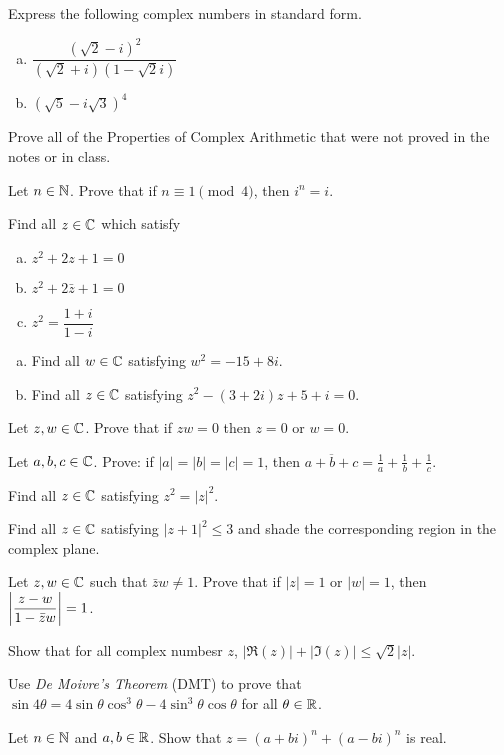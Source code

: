 
\question Express the following complex numbers in standard form.
\begin{enumerate}[(a)]
  \item $\dfrac{(\sqrt2-i)^2}{(\sqrt2+i)(1-\sqrt2i)}$
  \item $(\sqrt5-i\sqrt3)^4$
\end{enumerate}

\question Prove all of the Properties of Complex Arithmetic that were not proved in the notes or in class.

\question Let $n \in \mathbb{N}$. Prove that if $n \equiv 1 \pmod 4$, then $i^n = i$.

\question Find all $z \in \mathbb{C}$ which satisfy
\begin{enumerate}[(a)]
  \item $z^2+2z+1=0$
  \item $z^2+2\bar{z}+1=0$
  \item $z^2 = \dfrac{1+i}{1-i}$
\end{enumerate}

\question \begin{enumerate}[(a)]
  \item Find all $w\in\mathbb{C}$ satisfying $w^2 = -15 + 8i$.
  \item Find all $z\in\mathbb{C}$ satisfying $z^2-(3+2i)z+5+i=0$.
\end{enumerate}

\question Let $z, w \in \mathbb{C}$. Prove that if $zw = 0$ then $z = 0$ or $w = 0$.

\question Let $a,b,c \in \mathbb{C}$. Prove: if $|a|=|b|=|c|=1$, then $\overline{a+b+c}=\frac1a+\frac1b+\frac1c$.

\question Find all $z\in\mathbb{C}$ satisfying $z^2=|z|^2$.

\question Find all $z\in\mathbb{C}$ satisfying $|z+1|^2 \leq 3$ and shade the corresponding region in the complex plane.

\question Let $z,w\in\mathbb{C}$ such that $\bar z w \neq 1$.
Prove that if $|z|=1$ or $|w|=1$, then $\abs{\dfrac{z-w}{1 -\bar z w}}=1$.

\question Show that for all complex numbesr $z$, $|\Re(z)|+|\Im(z)|\leq\sqrt{2}|z|$.

\question Use \emph{De Moivre's Theorem} (DMT) to prove that
$\sin 4\theta = 4\sin\theta\cos^3\theta - 4\sin^3\theta\cos\theta$ for all $\theta\in\mathbb{R}$.

\question Let $n\in\mathbb{N}$ and $a,b\in\mathbb{R}$. Show that $z=(a+bi)^n+(a-bi)^n$ is real.

